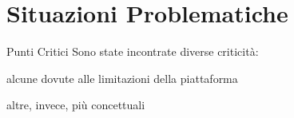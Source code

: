 \section{Situazioni Problematiche}

\begin{frame}{Punti Critici}
  Sono state incontrate diverse criticità:

  alcune dovute alle limitazioni della piattaforma

  altre, invece, più concettuali
\end{frame}

